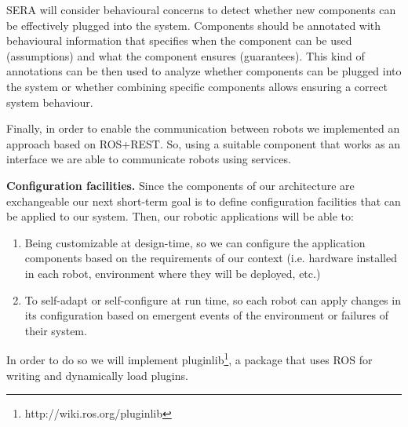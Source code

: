 SERA will consider behavioural concerns to detect whether new components can be effectively plugged into the system. 
Components should be annotated with behavioural information that specifies when the component can be used (assumptions) and what the component ensures (guarantees). 
This kind of annotations can be then used to analyze whether components can be plugged into the system or whether combining specific components allows ensuring a correct system behaviour. 

Finally, in order to enable the communication between robots we implemented an approach based on ROS+REST.
So, using a suitable component that works as an interface we are able to communicate robots using services.

\textbf{Configuration facilities.}
Since the components of our architecture are exchangeable our next short-term goal is to define configuration facilities that can be applied to our system. %
Then, our robotic applications will be able to:

\begin{enumerate}
\item Being customizable at design-time, so we can configure the application components based on the requirements of our context (i.e. hardware installed in each robot, environment where they will be deployed, etc.)
\item To self-adapt or self-configure at run time, so each robot can apply changes in its configuration based on emergent events of the environment or failures of their system.
\end{enumerate}

In order to do so we will implement pluginlib\footnote{http://wiki.ros.org/pluginlib}, a package that uses ROS for writing and dynamically load plugins. %



